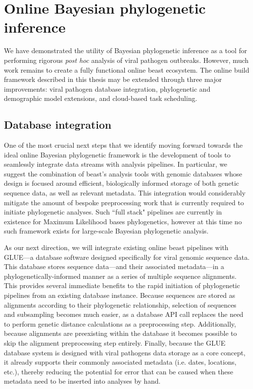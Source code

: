 \section{Online Bayesian phylogenetic inference}

We have demonstrated the utility of Bayesian phylogenetic inference as a tool for performing rigorous \textit{post hoc} analysis of viral pathogen outbreaks.
However, much work remains to create a fully functional online \gls{beast} ecosystem.
The online build framework described in this thesis may be extended through three major improvements: viral pathogen database integration, phylogenetic and demographic model extensions, and cloud-based task scheduling.

\subsection{Database integration}

One of the most crucial next steps that we identify moving forward towards the ideal online Bayesian phylogenetic framework is the development of tools to seamlessly integrate data streams with analysis pipelines.
In particular, we suggest the combination of \gls{beast}'s analysis tools with genomic databases whose design is focused around efficient, biologically informed storage of both genetic sequence data, as well as relevant metadata.
This integration would considerably mitigate the amount of bespoke preprocessing work that is currently required to initiate phylogenetic analyses.
Such ``full stack" pipelines are currently in existence for Maximum Likelihood bases phylogenetics\cite{hadfield2019nextstrain}, however at this time no such framework exists for large-scale Bayesian phylogenetic analysis.

As our next direction, we will integrate existing online \gls{beast} pipelines with GLUE\cite{singer2018glue}---a database software designed specifically for viral genomic sequence data.
This database stores sequence data---and their associated metadata---in a phylogenetically-informed manner as a series of multiple sequence alignments.
This provides several immediate benefits to the rapid initiation of phylogenetic pipelines from an existing database instance.
Because sequences are stored as alignments according to their phylogenetic relationship, selection of sequences and subsampling becomes much easier, as a database API call replaces the need to perform genetic distance calculations as a preprocessing step.
Additionally, because alignments are preexisting within the database it becomes possible to skip the alignment preprocessing step entirely.
Finally, because the GLUE database system is designed with viral pathogens data storage as a core concept, it already supports their commonly associated metadata (i.e. dates, locations, etc.), thereby reducing the potential for error that can be caused when these metadata need to be inserted into analyses by hand.

